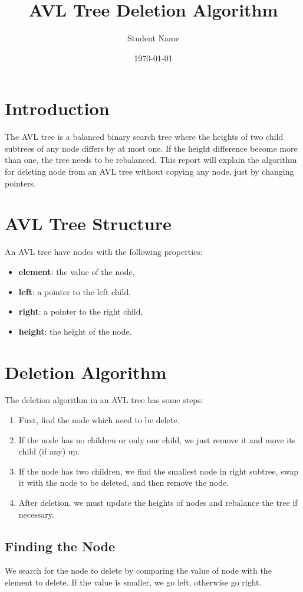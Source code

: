 \documentclass{article}
\title{AVL Tree Deletion Algorithm}
\author{Student Name}
\date{\today}
\begin{document}
\maketitle

\section{Introduction}
The AVL tree is a balanced binary search tree where the heights of two child subtrees of any node differs by at most one. If the height difference become more than one, the tree needs to be rebalanced. This report will explain the algorithm for deleting node from an AVL tree without copying any node, just by changing pointers. 

\section{AVL Tree Structure}
An AVL tree have nodes with the following properties:
\begin{itemize}
    \item \textbf{element}: the value of the node,
    \item \textbf{left}: a pointer to the left child,
    \item \textbf{right}: a pointer to the right child,
    \item \textbf{height}: the height of the node.
\end{itemize}

\section{Deletion Algorithm}
The deletion algorithm in an AVL tree has some steps:
\begin{enumerate}
    \item First, find the node which need to be delete.
    \item If the node has no children or only one child, we just remove it and move its child (if any) up.
    \item If the node has two children, we find the smallest node in right subtree, swap it with the node to be deleted, and then remove the node.
    \item After deletion, we must update the heights of nodes and rebalance the tree if necessary.
\end{enumerate}

\subsection{Finding the Node}
We search for the node to delete by comparing the value of node with the element to delete. If the value is smaller, we go left, otherwise go right.
\end{document}
